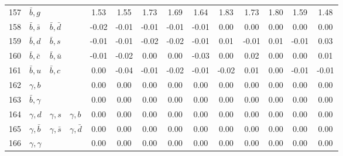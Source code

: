 \begin{tabularx}{\textwidth}{rXXX@{}S@{}S@{}S@{}S@{}S@{}S@{}S@{}S@{}S@{}S}
157 & $\bar b, g$      &                   &                  &  1.53 &  1.55 &  1.73 &  1.69 &  1.64 &  1.83 &  1.73 &  1.80 &  1.59 &  1.48 \\
158 & $\bar b, \bar s$ & $\bar b, \bar d$  &                  & -0.02 & -0.01 & -0.01 & -0.01 & -0.01 &  0.00 &  0.00 &  0.00 &  0.00 &  0.00 \\
159 & $\bar b, d$      & $\bar b, s$       &                  & -0.01 & -0.01 & -0.02 & -0.02 & -0.01 &  0.01 & -0.01 &  0.01 & -0.01 &  0.03 \\
160 & $\bar b, \bar c$ & $\bar b, \bar u$  &                  & -0.01 & -0.02 &  0.00 &  0.00 & -0.03 &  0.00 &  0.02 &  0.00 &  0.00 &  0.01 \\
161 & $\bar b, u$      & $\bar b, c$       &                  &  0.00 & -0.04 & -0.01 & -0.02 & -0.01 & -0.02 &  0.01 &  0.00 & -0.01 & -0.01 \\
162 & $\gamma, b$      &                   &                  &  0.00 &  0.00 &  0.00 &  0.00 &  0.00 &  0.00 &  0.00 &  0.00 &  0.00 &  0.00 \\
163 & $\bar b, \gamma$ &                   &                  &  0.00 &  0.00 &  0.00 &  0.00 &  0.00 &  0.00 &  0.00 &  0.00 &  0.00 &  0.00 \\
164 & $\gamma,  d$     & $\gamma, s$       & $\gamma, b$      &  0.00 &  0.00 &  0.00 &  0.00 &  0.00 &  0.00 &  0.00 &  0.00 &  0.00 &  0.00 \\
165 & $\gamma, \bar b$ & $\gamma, \bar s$  & $\gamma, \bar d$ &  0.00 &  0.00 &  0.00 &  0.00 &  0.00 &  0.00 &  0.00 &  0.00 &  0.00 &  0.00 \\
166 & $\gamma, \gamma$ &                   &                  &  0.00 &  0.00 &  0.00 &  0.00 &  0.00 &  0.00 &  0.00 &  0.00 &  0.00 &  0.00 \\
\bottomrule
\end{tabularx}
